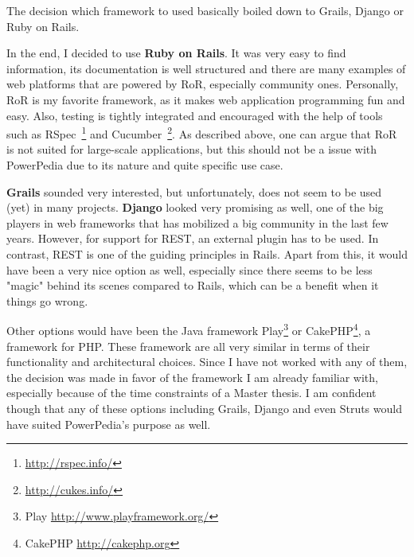 The decision which framework to used basically boiled down to Grails, Django or Ruby on Rails. 

In the end, I decided to use \textbf{Ruby on Rails}. It was very easy to find information, its documentation is well structured and there are many examples of web platforms that are powered by RoR, especially community ones.
Personally, RoR is my favorite framework, as it makes web application programming fun and easy. Also, testing is tightly integrated and encouraged with the help of tools such as RSpec~\footnote{\url{http://rspec.info/}} and Cucumber~\footnote{\url{http://cukes.info/}}. As described above, one can argue that RoR is not suited for large-scale applications, but this should not be a issue with PowerPedia due to its nature and quite specific use case.  

\textbf{Grails} sounded very interested, but unfortunately, does not seem to be used (yet) in many projects. \textbf{Django} looked very promising as well, one of the big players in web frameworks that has mobilized a big community in the last few years. However, for support for REST, an external plugin has to be used. In contrast, REST is one of the guiding principles in Rails. Apart from this, it would have been a very nice option as well, especially since there seems to be less "magic" behind its scenes compared to Rails, which can be a benefit when it things go wrong.


Other options would have been the Java framework Play\footnote{Play \url{http://www.playframework.org/}} or CakePHP\footnote{CakePHP \url{http://cakephp.org}}, a framework for PHP. These framework are all very similar in terms of their functionality and architectural choices. Since I have not worked with any of them, the decision was made in favor of the framework I am already familiar with, especially because of the time constraints of a Master thesis. I am confident though that any of these options including Grails, Django and even Struts would have suited PowerPedia's purpose as well.
